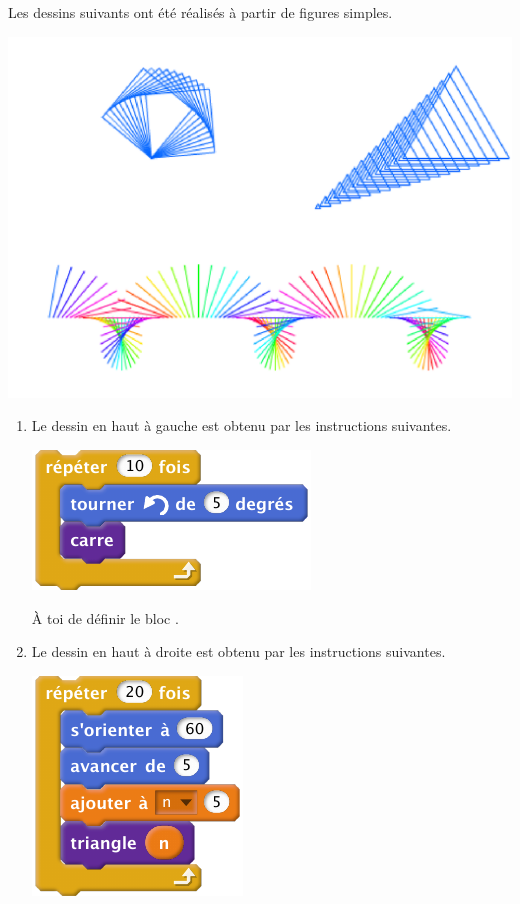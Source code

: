 \documentclass[class=report,crop=false, 12pt]{standalone}
\begin{document}
\begin{activite}

Les dessins suivants ont été réalisés à partir de figures simples.

\begin{center}
  \includegraphics[scale=\scaleecran]{ecran-11-ex3} 
\end{center}

\begin{enumerate}
  \item Le dessin en haut à gauche est obtenu par les instructions suivantes.
\begin{center}
  \includegraphics[scale=\scalebloc]{bloc-11-ex3a} 
\end{center} 

\`A toi de définir le bloc .


  
  \item Le dessin en haut à droite est obtenu par les instructions suivantes.
\begin{center}
  \includegraphics[scale=\scalebloc]{bloc-11-ex3b} 
\end{center} 


\end{enumerate}
\end{activite}
\end{document}
